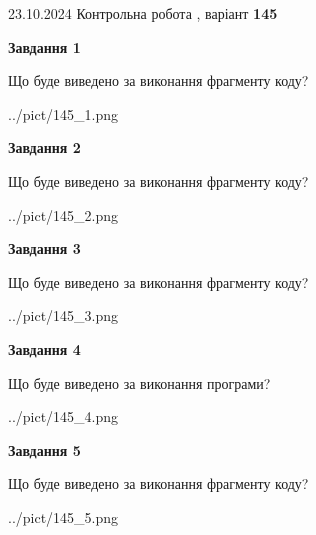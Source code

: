 \documentclass[12pt, ukrainian]{article}
\begin{document}
{\Large{23.10.2024 Контрольна робота , варіант  \No \textbf { 145 }\par}}
{
\begin {large}
{\begin {center}\textbf{Завдання 1}\end {center}}

Що буде виведено за виконання фрагменту коду?\par
\begin{center}
	{../pict/145_1.png}
\end{center}
\newpage

{\begin {center}\textbf{Завдання 2}\end {center}}

Що буде виведено за виконання фрагменту коду?\par
\begin{center}
	{../pict/145_2.png}
\end{center}
\newpage

{\begin {center}\textbf{Завдання 3}\end {center}}

Що буде виведено за виконання фрагменту коду?\par
\begin{center}
	{../pict/145_3.png}
\end{center}
\newpage

{\begin {center}\textbf{Завдання 4}\end {center}}

Що буде виведено за виконання програми?\par
\begin{center}
	{../pict/145_4.png}
\end{center}
\newpage

{\begin {center}\textbf{Завдання 5}\end {center}}

Що буде виведено за виконання фрагменту коду?\par
\begin{center}
	{../pict/145_5.png}
\end{center}
\newpage


\end{large}}
\end{document}
